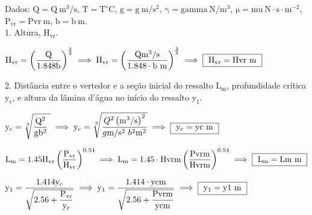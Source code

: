 \documentclass{article}
\newcommand{\myspace}{0.2cm}
\begin{document}

Dados: $\mathrm{Q = {{Q}} \ m^{3}/s}$, $\mathrm{T = {{T}} ^{\circ}C}$, $\mathrm{g = {{g}} \ m/s^{2}}$, $\mathrm{ \gamma = {{gamma}} \ N/m^{3}}$, $\mathrm{ \mu = {{mu}} \ N \! \cdot \! s \! \cdot \! m^{-2}}$, $\mathrm{P_{vr} = {{Pvr}} \ m }$, $\mathrm{ b = {{b}} \ m }$.  \\

1. Altura, $\mathrm{ H_{vr} }$.
\vspace{\myspace}

\begin{center}
	$ 
		\mathrm
		{ 
			H_{vr} = \left ( \dfrac{ Q }{ 1.848b } \right )^{ \frac{3}{2} }
		} 
		\implies
		\mathrm
		{
			H_{vr} = \left ( \dfrac{ {{Q}} m^{3}/s}{ 1.848 \cdot {{b}} \ m } \right )^{ \frac{3}{2} }
		} 
		\implies
		\fbox
		{ 
			$\mathrm
			{ 
				H_{vr} = {{Hvr}} \ m
			}$
		} 
	$ 
\end{center}
\vspace{\myspace}

2. Distância entre o vertedor e a seção inicial do ressalto $\mathrm{ L_{m} }$, profundidade crítica $\mathrm{ y_{c} }$, e altura da lâmina d'água no início do ressalto $\mathrm{ y_{1} }$.
\vspace{\myspace}
\begin{center}
	$ 
		\mathrm
		{ 
			y_{c}=\sqrt[3]{ \dfrac{ \mathrm{Q}^{2} }{ \mathrm{g}\mathrm{b}^2} \ }
		} 
		\implies
		\mathrm
		{
			y_{c} = \sqrt[3]{ \dfrac{ {{Q}}^{2} \left( \mathrm{m^{3}/s} \right )^{2} }{ {{g}} \mathrm{m/s^{2}} \ {{b}}^{2} \mathrm{m^{2}} } }
		} 
		\implies
		\fbox
		{ 
			$\mathrm
			{ 
				y_{c} = {{yc}} \ m
			}$
		} 
	$ 
\end{center}
\vspace{\myspace}

\begin{center}
	$ 
		\mathrm
		{ 
			L_{m} = 1.45H_{vr}\left ( \dfrac{P_{vr}}{H_{vr}} \right )^{0.54}
		} 
		\implies
		\mathrm
		{
			L_{m} = 1.45 \cdot {{Hvr}}m\left ( \dfrac{ {{Pvr}}m }{ {{Hvr}}m } \right )^{0.54}
		} 
		\implies
		\fbox
		{ 
			$\mathrm
			{ 
				L_{m} = {{Lm}} \ m
			}$
		} 
	$ 
\end{center}
\vspace{\myspace}

\begin{center}
	$ 
		\mathrm
		{ 
			y_{1} = \dfrac{ 1.414y_{c} }{ \sqrt{ 2.56 + \dfrac{ P_{vr} }{ y_{c} } } }
		} 
		\implies
		\mathrm
		{
			y_{1} = \dfrac{1.414 \cdot {{yc}}m}{ \sqrt{ 2.56 + \dfrac{ {{Pvr}}m }{ {{yc}}m } } }
		} 
		\implies
		\fbox
		{ 
			$\mathrm
			{
				y_{1}= {{y1}} \ m
			}$
		} 
	$ 
\end{center}
\vspace{\myspace}
\end{document}
